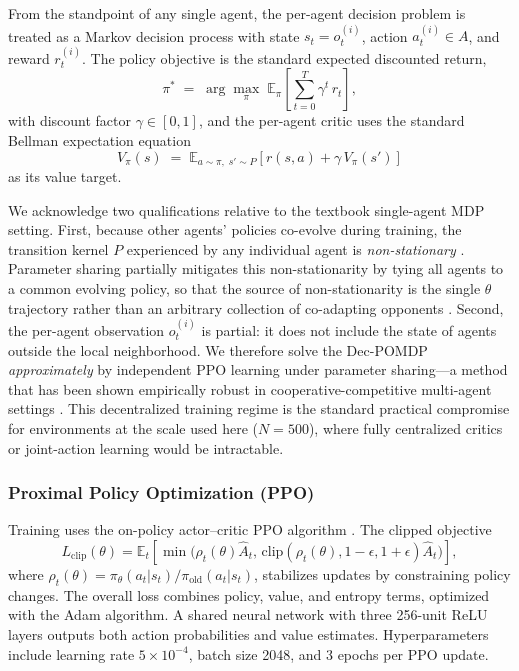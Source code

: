 \documentclass[pdflatex,sn-mathphys-num]{sn-jnl}%
\theoremstyle{thmstyleone}%
\theoremstyle{thmstyletwo}%
\theoremstyle{thmstylethree}%
\begin{document}
From the standpoint of any single agent, the per-agent decision problem is treated as a Markov decision process with state $s_t = o_t^{(i)}$, action $a_t^{(i)} \in A$, and reward $r_t^{(i)}$.  
The policy objective is the standard expected discounted return,
\begin{equation}
\pi^* \;=\; \arg\max_{\pi}\; \mathbb{E}_{\pi}\!\left[\sum_{t=0}^{T} \gamma^{t}\, r_t\right],
\end{equation}
with discount factor $\gamma \in [0,1]$, and the per-agent critic uses the standard Bellman expectation equation
\begin{equation}
V_\pi(s) \;=\; \mathbb{E}_{a \sim \pi,\; s' \sim P}\!\left[ r(s,a) + \gamma\, V_\pi(s') \right]
\end{equation}
as its value target.

We acknowledge two qualifications relative to the textbook single-agent MDP setting.  
First, because other agents' policies co-evolve during training, the transition kernel $P$ experienced by any individual agent is \emph{non-stationary} \citep{Lowe2017, Foerster2018}.  
Parameter sharing partially mitigates this non-stationarity by tying all agents to a common evolving policy, so that the source of non-stationarity is the single $\theta$ trajectory rather than an arbitrary collection of co-adapting opponents \citep{Yu2022}.  
Second, the per-agent observation $o_t^{(i)}$ is partial: it does not include the state of agents outside the local neighborhood.  
We therefore solve the Dec-POMDP \emph{approximately} by independent PPO learning under parameter sharing---a method that has been shown empirically robust in cooperative-competitive multi-agent settings \citep{Yu2022, Lowe2017}.  
This decentralized training regime is the standard practical compromise for environments at the scale used here ($N = 500$), where fully centralized critics or joint-action learning would be intractable.

\subsubsection{Proximal Policy Optimization (PPO)}
Training uses the on-policy actor--critic PPO algorithm \citep{Schulman2017}.  
The clipped objective
\[
L_{\text{clip}}(\theta)=\mathbb{E}_t\!\left[\min\!\big(\rho_t(\theta)\hat{A}_t,
\,\text{clip}(\rho_t(\theta),1-\epsilon,1+\epsilon)\hat{A}_t\big)\right],
\]
where \(\rho_t(\theta)=\pi_\theta(a_t|s_t)/\pi_{\text{old}}(a_t|s_t)\), stabilizes updates by constraining policy changes.  
The overall loss combines policy, value, and entropy terms, optimized with the Adam algorithm.  
A shared neural network with three 256-unit ReLU layers outputs both action probabilities and value estimates.  
Hyperparameters include learning rate \(5\times10^{-4}\), batch size 2048, and 3 epochs per PPO update.
\end{document}
